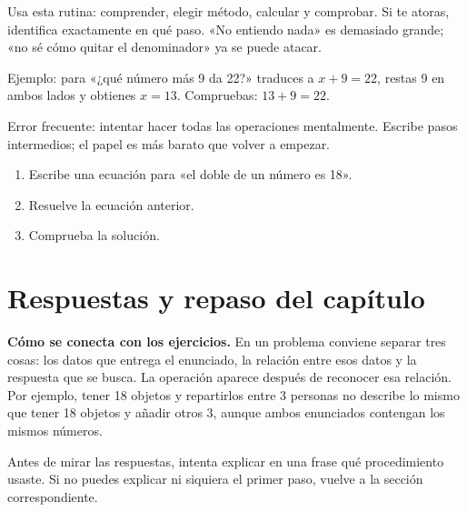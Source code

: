 \documentclass[10pt,oneside,openany]{book}
\begin{document}
Usa esta rutina: comprender, elegir método, calcular y comprobar. Si te atoras, identifica exactamente en qué paso. «No entiendo nada» es demasiado grande; «no sé cómo quitar el denominador» ya se puede atacar.

\begin{ejemplo}
Ejemplo: para «¿qué número más 9 da 22?» traduces a $x+9=22$, restas 9 en ambos lados y obtienes $x=13$. Compruebas: $13+9=22$.
\end{ejemplo}

\begin{ojo}
Error frecuente: intentar hacer todas las operaciones mentalmente. Escribe pasos intermedios; el papel es más barato que volver a empezar.
\end{ojo}

\begin{practica}

\begin{enumerate}

\item Escribe una ecuación para «el doble de un número es 18».

\item Resuelve la ecuación anterior.

\item Comprueba la solución.

\end{enumerate}

\end{practica}



\section{Respuestas y repaso del capítulo}

\textbf{Cómo se conecta con los ejercicios.} En un problema conviene separar tres cosas: los datos que entrega el enunciado, la relación entre esos datos y la respuesta que se busca. La operación aparece después de reconocer esa relación. Por ejemplo, tener 18 objetos y repartirlos entre 3 personas no describe lo mismo que tener 18 objetos y añadir otros 3, aunque ambos enunciados contengan los mismos números.

Antes de mirar las respuestas, intenta explicar en una frase qué procedimiento usaste. Si no puedes explicar ni siquiera el primer paso, vuelve a la sección correspondiente.
\end{document}
